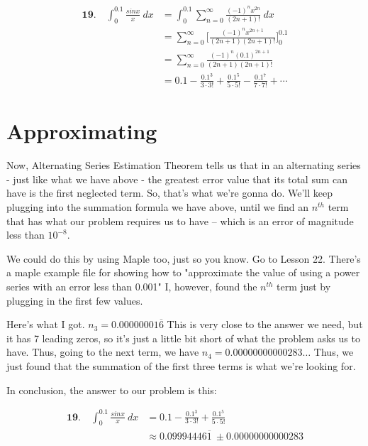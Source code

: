 \begin{align}
	\textbf{19.}\quad \int_{0}^{0.1} 
	\frac{sinx}{x}\ dx
	&=
	\int_{0}^{0.1}
	\sum_{n=0}^{\infty}
	\frac{
		(-1)^nx^{2n}
	}{
		(2n+1)!
	}\ dx \\
	&=
	\sum_{n=0}^{\infty}
	\Bigg[
	\frac{
		(-1)^nx^{2n+1}
	}{
		(2n+1)
		(2n+1)!
	}
	\Bigg]_0^{0.1} \\
	&=
	\sum_{n=0}^{\infty}
	\frac{
		(-1)^n(0.1)^{2n+1}
	}{
		(2n+1)
		(2n+1)!
	} \\
	&=
	0.1 
	-
	\frac{
		0.1^{3}
	}{
	    3\cdot3!
	}
	+
	\frac{
		0.1^{5}
	}{
		5\cdot5!
	}
	-
	\frac{
		0.1^{7}
	}{
		7\cdot7!
	}
	+
	\cdots
\end{align}

\section*{Approximating}

Now, Alternating Series
Estimation Theorem tells us
that in an alternating series
- just like what we have above -
the greatest error value 
that its total sum can have 
is the first neglected term.
So, that's what we're gonna do.
We'll keep plugging into the
summation formula we have above,
until we find an $ n^{th} $ term
that has what our problem requires
us to have -- which is an error
of magnitude less than $ 10^{-8} $.

We could do this by using Maple too,
just so you know. 
Go to Lesson 22. 
There's a maple example file for
showing how to "approximate the value of  using a power series with an error less than 0.001"
I, however, found the $ n^{th} $ term
just by plugging in the first few values.

Here's what I got. 
$ n_3 = 0.00000001\overline{6} $
This is very close to the answer we
need, but it has 7 leading zeros, so
it's just a little bit short of what
the problem asks us to have. Thus,
going to the next term, we have
$ n_4 = 0.00000000000283\ldots $
Thus, we just found that the
summation of the first three terms
is what we're looking for. 

In conclusion, the answer to
our problem is this:

\begin{align}
	\textbf{19.}\quad \int_{0}^{0.1} 
	\frac{sinx}{x}\ dx
	&=
	0.1 
	-
	\frac{
		0.1^{3}
	}{
		3\cdot3!
	}
	+
	\frac{
		0.1^{5}
	}{
		5\cdot5!
	} \\
	&\approx
	0.09994446\overline{1}
	\ \pm  0.00000000000283
\end{align}

